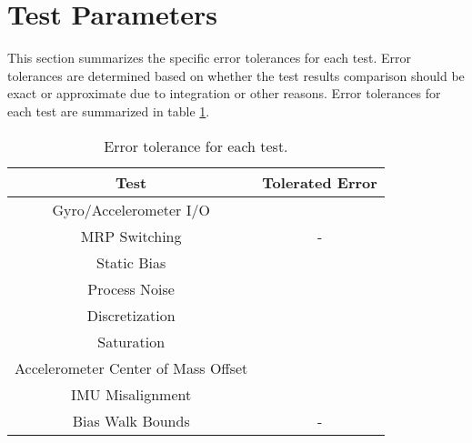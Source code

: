 \section{Test Parameters}
This section summarizes the specific error tolerances for each test. Error tolerances are determined based on whether the test results comparison should be exact or approximate due to integration or other reasons. Error tolerances for each test are summarized in table \ref{tab:errortol}. 
	
	\begin{table}[H]
		\caption{Error tolerance for each test.}
		\label{tab:errortol}
		\centering \fontsize{10}{10}\selectfont
		\begin{tabular}{ c | c } %
			\hline
			\textbf{Test}   									& \textbf{Tolerated Error} 						  \\ \hline
			Gyro/Accelerometer I/O 						& 		   \\ \hline
			MRP Switching 									& - 														   \\ \hline
			Static Bias 										&  	 		       \\ \hline
			Process Noise 									& 			      \\ \hline
			Discretization 				  					   &   \\ \hline
			Saturation 											&  	  \\ \hline
			Accelerometer Center of Mass Offset &  \\ \hline
			IMU Misalignment 								&  \\ \hline
			Bias Walk Bounds 								& - 														   \\ \hline
		\end{tabular}
	\end{table}